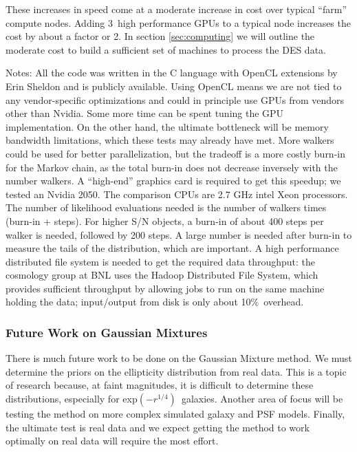 \documentclass[12pt]{article}
\newcommand{\devprof}{exp$(-r^{1/4})$}
\newcommand{\iooverhead}{10\%}
\newcommand{\ngpus}{3}
\newcommand{\costincrease}{2}
\begin{document}
These increases in speed come at a moderate increase in cost over typical
``farm'' compute nodes.  Adding \ngpus\ high performance GPUs to a typical node
increases the cost by about a factor or \costincrease. In section
\ref{sec:computing} we will outline the moderate cost to build a sufficient set
of machines to process the DES data.

{\it
    
Notes:  All the code was written in the C language with OpenCL extensions by
Erin Sheldon and is publicly available.  Using OpenCL means we are not tied to
any vendor-specific optimizations and could in principle use GPUs from vendors
other than Nvidia. Some more time can be spent tuning the GPU implementation.
On the other hand, the ultimate bottleneck will be memory bandwidth
limitations, which these tests may already have met.   More walkers could be
used for better parallelization, but the tradeoff is a more costly burn-in for
the Markov chain, as the total burn-in does not decrease inversely with the
number walkers.  A ``high-end'' graphics card is required to get this speedup;
we tested an Nvidia 2050. The comparison CPUs are 2.7 GHz intel Xeon
processors.  The number of likelihood evaluations needed is the number of
walkers times (burn-in + steps).  For higher S/N objects, a burn-in of about
400 steps per walker is needed, followed by 200 steps.  A large number is
needed after burn-in to measure the tails of the distribution, which are
important.  A high performance distributed file system is needed to get the
required data throughput: the cosmology group at BNL uses the Hadoop
Distributed File System, which provides sufficient throughput by allowing jobs
to run on the same machine holding the data; input/output from disk is only
about \iooverhead\ overhead.  }

\subsubsection{Future Work on Gaussian Mixtures}

There is much future work to be done on the Gaussian Mixture method.  We must
determine the priors on the ellipticity distribution from real data.  This is a
topic of research because, at faint magnitudes, it is difficult to determine
these distributions, especially for \devprof\ galaxies\cite{Miller12}.  Another
area of focus will be testing the method on more complex simulated galaxy and
PSF models.  Finally, the ultimate test is real data and we expect getting the
method to work optimally on real data will require the most effort.
\end{document}
